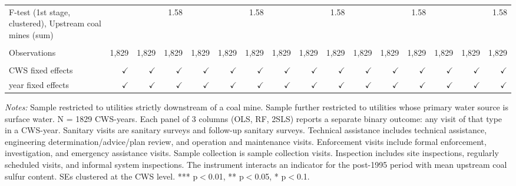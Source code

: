 \begin{table}[htbp]
\begin{adjustbox}{width = \textwidth, center}
\begin{tabular}{lrrrrrrrrrrrrrrr}
         F-test (1st stage, clustered), Upstream coal mines (sum) &               &               & 1.58          &               &               & 1.58          &               &                & 1.58          &               &               & 1.58          &               &               & 1.58\\  
         
          \\
         
         Observations                                             & 1,829         & 1,829         & 1,829         & 1,829         & 1,829         & 1,829         & 1,829         & 1,829          & 1,829         & 1,829         & 1,829         & 1,829         & 1,829         & 1,829         & 1,829\\  
         
          \\
         
         CWS fixed effects                                        & $\checkmark$  & $\checkmark$  & $\checkmark$  & $\checkmark$  & $\checkmark$  & $\checkmark$  & $\checkmark$  & $\checkmark$   & $\checkmark$  & $\checkmark$  & $\checkmark$  & $\checkmark$  & $\checkmark$  & $\checkmark$  & $\checkmark$\\   
         year fixed effects                                       & $\checkmark$  & $\checkmark$  & $\checkmark$  & $\checkmark$  & $\checkmark$  & $\checkmark$  & $\checkmark$  & $\checkmark$   & $\checkmark$  & $\checkmark$  & $\checkmark$  & $\checkmark$  & $\checkmark$  & $\checkmark$  & $\checkmark$\\   
         
         \bottomrule
         
      \end{tabular}
      
      
      
   \end{adjustbox}
      {\tiny\linespread{1}\selectfont \par \raggedright 
   \textit{Notes:} Sample restricted to utilities strictly downstream of a coal mine. Sample further restricted to utilities whose primary water source is surface water. N = 1829 CWS-years. Each panel of 3 columns (OLS, RF, 2SLS) reports a separate binary outcome: any visit of that type in a CWS-year. Sanitary visits are sanitary surveys and follow-up sanitary surveys. Technical assistance includes technical assistance, engineering determination/advice/plan review, and operation and maintenance visits. Enforcement visits include formal enforcement, investigation, and emergency assistance visits. Sample collection is sample collection visits. Inspection includes site inspections, regularly scheduled visits, and informal system inspections. The instrument interacts an indicator for the post-1995 period with mean upstream coal sulfur content. SEs clustered at the CWS level. *** p$<$0.01, ** p$<$0.05, * p$<$0.1.}
   
\end{table}


